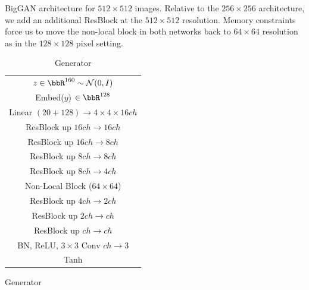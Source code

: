\begin{table}[ht]
         \caption{\label{tab:resnets_imagenet512} BigGAN architecture for $512\times 512$ images.
         Relative to the $256\times 256$ architecture, we add an additional ResBlock at the $512\times 512$ resolution. Memory constraints force us to move the non-local block in both networks back to  $64\times 64$ resolution as in the $128\times 128$ pixel setting.}
          \centering
          \small
          \begin{subtable}{.4\textwidth}
              \centering
              {\begin{tabular}{c}
                  \toprule
                  \midrule
                  $z\in \bbR^{160} \sim \mathcal{N}(0, I)$ \\
                  Embed($y$) $\in \bbR^{128}$ \\
                  \midrule
                  Linear $(20+128) \rightarrow 4 \times 4 \times 16 ch $ \\
                  \midrule
                  ResBlock up $16ch \rightarrow 16ch$ \\
                  \midrule
                  ResBlock up $16ch \rightarrow 8ch$\\
                  \midrule
                  ResBlock up $8ch \rightarrow 8ch$\\
                  \midrule
                  ResBlock up $8ch \rightarrow 4ch$\\
                   \midrule
                  Non-Local Block ($64\times 64$) \\
                  \midrule
                  ResBlock up $4ch \rightarrow 2ch$\\
                 \midrule
                  ResBlock up $2ch \rightarrow ch$\\
                  \midrule
                  ResBlock up $ch \rightarrow ch$\\
                  \midrule
                  BN, ReLU, $3\times 3$ Conv $ch\rightarrow 3$ \\
                  \midrule
                  Tanh\\
                  \midrule
                  \bottomrule
              \end{tabular}}
              \caption{\label{tab:gen_resnet_imagenet_512} Generator}
          \end{subtable}
          \begin{subtable}{.4\textwidth}
              \centering
              {\begin{tabular}{c}

\end{tabular}}
\end{subtable}
\end{table}
